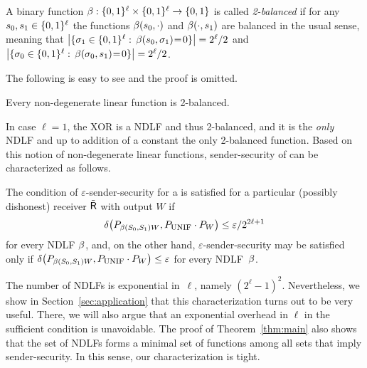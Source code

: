 \begin{definition}\label{def:balanced} 
  A binary function $\beta:\{0,1\}^{\ell}\times\{0,1\}^{\ell}
  \rightarrow \{0,1\}$ is called {\em 2-balanced} if for any
  $s_0,s_1 \in \{0,1\}^{\ell}$ the functions $\beta(s_0,\cdot)$ and
  $\beta(\cdot,s_1)$ are balanced in the usual sense, meaning that
  $\big|\{\sigma_1 \in \{0,1\}^{\ell}:\,\beta(s_0,\sigma_1)\hspace{-0.5ex}=\hspace{-0.4ex}0\}\big| =
  2^{\ell}/2$ and $\big|\{\sigma_0 \in
      \{0,1\}^{\ell}:\,\beta(\sigma_0,s_1)\hspace{-0.5ex}=\hspace{-0.4ex}0\}\big| = 2^{\ell}/2$.
\end{definition}
%
The following is easy to see and the proof is omitted. 
\begin{lemma}
Every non-degenerate linear function is 2-balanced. 
\end{lemma}
%
In case $\ell = 1$, the XOR is a NDLF and thus 2-balanced, and it is
the {\em only} NDLF and up to addition of a constant the only
2-balanced function.  Based on this notion of non-degenerate linear
functions, sender-security of \RandStringOT can be characterized as
follows.

\begin{theorem}\label{thm:main} 
  The condition of $\varepsilon$-sender-security for a \RandlStringOT
  is satisfied for a particular (possibly dishonest) receiver $\tilde{\sf R}$
  with output $W$ if
$$
\delta\big( P_{\beta(S_0,S_1) W} , P_{\mbox{\sc unif}} \cdot P_W \big) \leq \varepsilon/2^{2\ell+1}
$$
for every NDLF $\beta$, and, on the other hand, 
$\varepsilon$-sender-security may be satisfied only if $\delta\big( P_{\beta(S_0,S_1) W} , P_{\mbox{\sc unif}}
\cdot P_W \big) \leq \varepsilon$ for every NDLF~$\beta$. 
\end{theorem}
The number of  NDLFs is
exponential in~$\ell$, namely $(2^{\ell}-1)^2$.  Nevertheless, we show
in Section~\ref{sec:application} that this characterization turns out
to be very useful. There, we will also argue that an exponential
overhead in $\ell$ in the sufficient condition is unavoidable. The
proof of Theorem~\ref{thm:main} also shows that the set of NDLFs forms
a minimal set of functions among all sets that imply sender-security.
In this sense, our characterization is tight.

